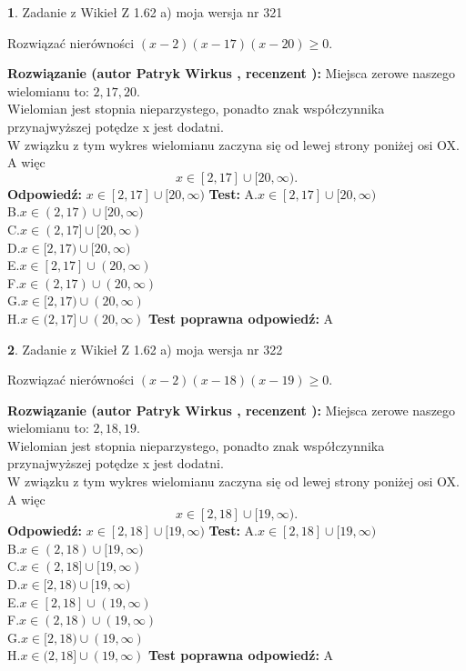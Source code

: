 \documentclass[12pt, a4paper]{article}
\theoremstyle{definition} %
\newtheorem{zad}{}
\newcommand{\zadStart}[1]{\begin{zad}#1\newline}
\newcommand{\zadStop}{\end{zad}}
\newcommand{\rozwStart}[2]{\noindent \textbf{Rozwiązanie (autor #1 , recenzent #2): }\newline}
\newcommand{\rozwStop}{\newline}
\newcommand{\odpStart}{\noindent \textbf{Odpowiedź:}\newline}
\newcommand{\odpStop}{\newline}
\newcommand{\testStart}{\noindent \textbf{Test:}\newline}
\newcommand{\testStop}{\newline}
\newcommand{\kluczStart}{\noindent \textbf{Test poprawna odpowiedź:}\newline}
\newcommand{\kluczStop}{\newline}
\begin{document}
\zadStart{Zadanie z Wikieł Z 1.62 a) moja wersja nr 321}

Rozwiązać nierówności $(x-2)(x-17)(x-20)\ge0$.
\zadStop
\rozwStart{Patryk Wirkus}{}
Miejsca zerowe naszego wielomianu to: $2, 17, 20$.\\
Wielomian jest stopnia nieparzystego, ponadto znak współczynnika przy\linebreak najwyższej potędze x jest dodatni.\\ W związku z tym wykres wielomianu zaczyna się od lewej strony poniżej osi OX. A więc $$x \in [2,17] \cup [20,\infty).$$
\rozwStop
\odpStart
$x \in [2,17] \cup [20,\infty)$
\odpStop
\testStart
A.$x \in [2,17] \cup [20,\infty)$\\
B.$x \in (2,17) \cup [20,\infty)$\\
C.$x \in (2,17] \cup [20,\infty)$\\
D.$x \in [2,17) \cup [20,\infty)$\\
E.$x \in [2,17] \cup (20,\infty)$\\
F.$x \in (2,17) \cup (20,\infty)$\\
G.$x \in [2,17) \cup (20,\infty)$\\
H.$x \in (2,17] \cup (20,\infty)$
\testStop
\kluczStart
A
\kluczStop



\zadStart{Zadanie z Wikieł Z 1.62 a) moja wersja nr 322}

Rozwiązać nierówności $(x-2)(x-18)(x-19)\ge0$.
\zadStop
\rozwStart{Patryk Wirkus}{}
Miejsca zerowe naszego wielomianu to: $2, 18, 19$.\\
Wielomian jest stopnia nieparzystego, ponadto znak współczynnika przy\linebreak najwyższej potędze x jest dodatni.\\ W związku z tym wykres wielomianu zaczyna się od lewej strony poniżej osi OX. A więc $$x \in [2,18] \cup [19,\infty).$$
\rozwStop
\odpStart
$x \in [2,18] \cup [19,\infty)$
\odpStop
\testStart
A.$x \in [2,18] \cup [19,\infty)$\\
B.$x \in (2,18) \cup [19,\infty)$\\
C.$x \in (2,18] \cup [19,\infty)$\\
D.$x \in [2,18) \cup [19,\infty)$\\
E.$x \in [2,18] \cup (19,\infty)$\\
F.$x \in (2,18) \cup (19,\infty)$\\
G.$x \in [2,18) \cup (19,\infty)$\\
H.$x \in (2,18] \cup (19,\infty)$
\testStop
\kluczStart
A
\kluczStop
\end{document}
